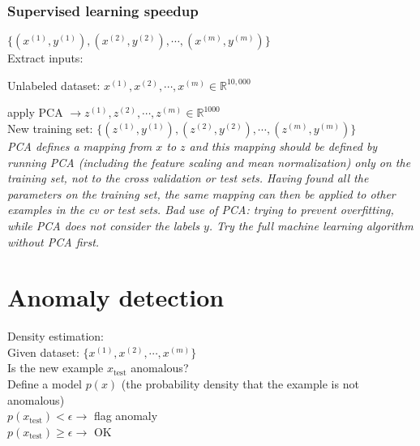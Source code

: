 \subsubsection{Supervised learning speedup}
$\{(x^{(1)}, y^{(1)}), (x^{(2)}, y^{(2)}), \cdots, (x^{(m)}, y^{(m)})\}$\\
Extract inputs:

Unlabeled dataset: $x^{(1)}, x^{(2)}, \cdots, x^{(m)} \in \mathbb{R}^{10,000}$

\indent apply PCA $\rightarrow z^{(1)}, z^{(2)}, \cdots, z^{(m)} \in \mathbb{R}^{1000}$\\
New training set:
$\{(z^{(1)}, y^{(1)}), (z^{(2)}, y^{(2)}), \cdots, (z^{(m)}, y^{(m)})\}$\\

\emph{\textcolor{Bittersweet}{PCA defines a mapping from $x$ to $z$ and this mapping should be defined by running PCA (including the feature scaling and mean normalization) only on the training set, not to the cross validation or test sets. Having found all the parameters on the training set, the same mapping can then be applied to other examples in the cv or test sets. Bad use of PCA: trying to prevent overfitting, while PCA does not consider the labels $y$. Try the full machine learning algorithm without PCA first.}}


\section{Anomaly detection}
\label{sec:Anomaly detection}
Density estimation:\\
Given dataset: $\{x^{(1)}, x^{(2)}, \cdots, x^{(m)}\}$\\
Is the new example $x_\text{test}$ anomalous?\\
Define a model $p(x)$ (the probability density that the example is not anomalous)\\
$p(x_\text{test}) < \epsilon \rightarrow$ flag anomaly\\
$p(x_\text{test}) \geq \epsilon \rightarrow$ OK

%
